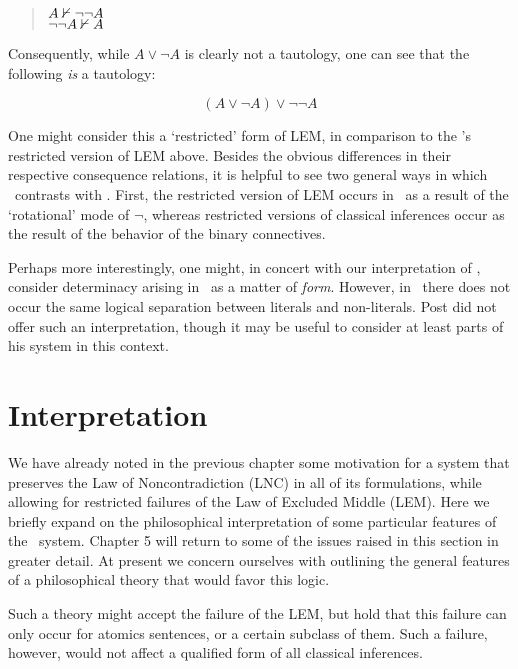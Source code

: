 \begin{quote}
	${A}\nvdash{\neg\neg A}$\\
	${\neg\neg A}\nvdash{A}$
\end{quote}

\noindent Consequently, while $A\vee\neg A$ is clearly not a tautology, one can see that the following \emph{is} a tautology:

\[ (A \vee \neg A) \vee \neg\neg A \]

\noindent One might consider this a `restricted' form of LEM, in comparison to the \GO's restricted version of LEM above. Besides the obvious differences in their respective consequence relations, it is helpful to see two general ways in which \Pthree\ contrasts with \GO. First, the restricted version of LEM occurs in \Pthree\ as a result of the `rotational' mode of $\neg$, whereas restricted versions of classical inferences occur as the result of the behavior of the binary connectives. 

Perhaps more interestingly, one might, in concert with our interpretation of \GO, consider determinacy arising in \Pthree\ as a matter of \emph{form}. However, in \Pthree\ there does not occur the same logical separation between literals and non-literals. Post did not offer such an interpretation, though it may be useful to consider at least parts of his system in this context.



	\section{Interpretation}\label{interpretation}

We have already noted in the previous chapter some motivation for a system that preserves the Law of Noncontradiction (LNC) in all of its formulations, while allowing for restricted failures of the Law of Excluded Middle (LEM). Here we briefly expand on the philosophical interpretation of some particular features of the \GO\ system. Chapter 5 will return to some of the issues raised in this section in greater detail. At present we concern ourselves with outlining the general features of a philosophical theory that would favor this logic. 

Such a theory might accept the failure of the LEM, but hold that this failure can only occur for atomics sentences, or a certain subclass of them. Such a failure, however, would not affect a qualified form of all classical inferences.  




